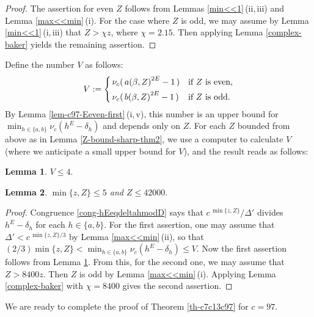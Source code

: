 \documentclass[11pt]{amsart}
\newtheorem{lem}{Lemma}[section]
\numberwithin{equation}{section}
\begin{document}
\begin{proof}
The assertion for even $Z$ follows from Lemmas \ref{min<<1}\,(ii,\,iii) and Lemma \ref{max<<min}\,(i).
For the case where $Z$ is odd, we may assume by Lemma \ref{min<<1}\,(i,\,iii) that $Z>\chi z$, where $\chi=2.15$.
Then applying Lemma \ref{complex-baker} yields the remaining assertion.
\end{proof}

Define the number $V$ as follows:
\[ V:=\begin{dcases}
\,\nu_c (\,{a(\beta,Z)}^{2E}-1\,)
& \text{if $Z$ is even,}\\
\,\nu_c (\,{b(\beta,Z)}^{2E}-1\,)
& \text{if $Z$ is odd.}
\end{dcases}\]
By Lemma \ref{lem-c97-Eeven-first}\,(i,\,v), this number is an upper bound for $\min_{h \in \{a,b\}} \nu_c(h^E-\delta_h)$ and depends only on $Z$.
For each $Z$ bounded from above as in Lemma \ref{Z-bound-sharp-thm2}, we use a computer to calculate $V$ (where we anticipate a small upper bound for $V$), and the result reads as follows:

\begin{lem} \label{Wieferich}
$V \le 4.$
\end{lem}

\begin{lem} \label{minzZ-very-sharp-thm2}
$\min\{z,Z\} \le 5$ and $Z \le 42000.$
\end{lem}

\begin{proof}
Congruence \eqref{cong-hEeqdeltahmodD} says that $c^{\,\min\{z,Z\}}/\Delta'$ divides $h^E-\delta_h$ for each $h \in \{a,b\}$.
For the first assertion, one may assume that $\Delta'<c^{\,\min\{z,Z\}/3}$ by Lemma \ref{max<<min}\,(ii), so that $(2/3)\min\{z,Z\}<\min_{h \in \{a,b\}}\nu_c(h^E-\delta_h) \le V$.
Now the first assertion follows from Lemma \ref{Wieferich}.
From this, for the second one, we may assume that $Z>8400z$.
Then $Z$ is odd by Lemma \ref{max<<min}\,(i).
Applying Lemma \ref{complex-baker} with $\chi=8400$ gives the second assertion.
\end{proof}

We are ready to complete the proof of Theorem \ref{th-c7c13c97} for $c=97$.
\end{document}
